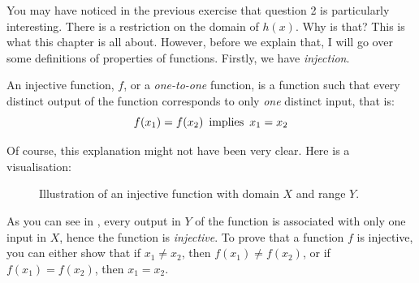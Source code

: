 \quad \quad You may have noticed in the previous exercise that question 2 is particularly \\ interesting. There is a restriction on the domain of \(h(x)\). Why is that? This is what this chapter is all about. However, before we explain that, I will go over some definitions of properties of functions. Firstly, we have \textit{injection}. 
\begin{definition}
  An injective function, \(f\), or a \textit{one-to-one} function, is a function such that every distinct output of the function corresponds to only \textit{one} distinct input, that is:  
  \begin{equation*}
    f(x_1) = f(x_2) \text{\, implies \,} x_1 = x_2 
  \end{equation*}
\end{definition}
Of course, this explanation might not have been very clear. Here is a visualisation:

\begin{figure}[h]
\centering
{}

\caption{Illustration of an injective function with domain \(X\) and range \(Y\).}
\label{inj}
\end{figure}


As you can see in , every output in \(Y\) of the function is associated with only one input in \(X\), hence the function is \textit{injective}. To prove that a function \(f\) is injective, you can either show that if \(x_1 \neq x_2\), then \(f(x_1) \neq f(x_2)\), or if \(f(x_1) = f(x_2)\), then \(x_1 = x_2\).

